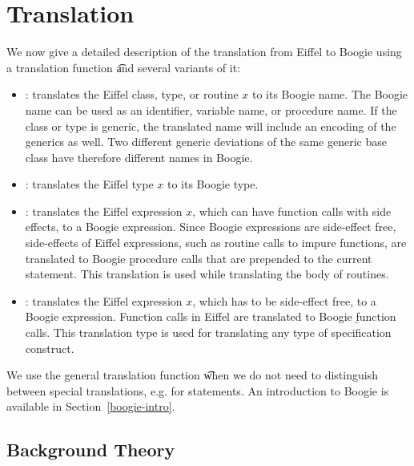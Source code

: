 \section{Translation}
\label{sec:ap-translation}

We now give a detailed description of the translation from Eiffel to Boogie using a translation function \t and several variants of it:

\begin{itemize}
\item {}: translates the Eiffel class, type, or routine $x$ to its Boogie name. The Boogie name can be used as an identifier, variable name, or procedure name. If the class or type is generic, the translated name will include an encoding of the generics as well. Two different generic deviations of the same generic base class have therefore different names in Boogie.
\item {}: translates the Eiffel type $x$ to its Boogie type.
\item {}: translates the Eiffel expression $x$, which can have function calls with side effects, to a Boogie expression. Since Boogie expressions are side-effect free, side-effects of Eiffel expressions, such as routine calls to impure functions, are translated to Boogie \b{procedure} calls that are prepended to the current statement. This translation is used while translating the body of routines.
\item {}: translates the Eiffel expression $x$, which has to be side-effect free, to a Boogie expression. Function calls in Eiffel are translated to Boogie \b{function} calls. This translation type is used for translating any type of specification construct.
\end{itemize}

We use the general translation function \t when we do not need to distinguish between special translations, e.g. for statements.
An introduction to Boogie is available in Section~\ref{boogie-intro}.


\subsection{Background Theory}

